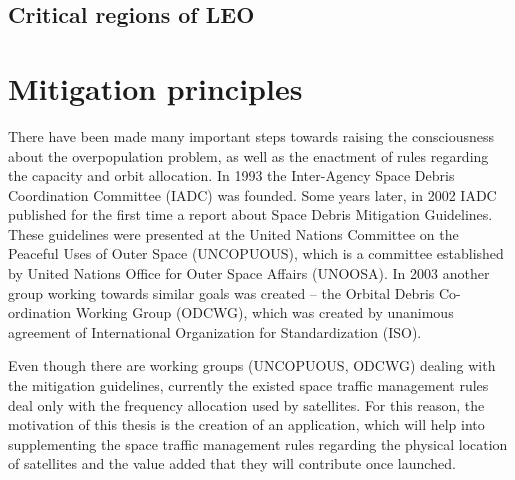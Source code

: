 

\subsection{Critical regions of LEO}
\bigskip

\section{Mitigation principles}
\bigskip

There have been made many important steps towards raising the consciousness about the overpopulation problem, as well as the enactment of rules regarding the capacity and orbit allocation. In 1993 the Inter-Agency Space Debris Coordination Committee (IADC) was founded. Some years later, in 2002 IADC published for the first time a report about Space Debris Mitigation Guidelines. These guidelines were presented at the United Nations Committee on the Peaceful Uses of Outer Space (UNCOPUOUS), which is a committee established by United Nations Office for Outer Space Affairs (UNOOSA). In 2003 another group working towards similar goals was created – the Orbital Debris Co-ordination Working Group (ODCWG), which was created by unanimous agreement of International Organization for Standardization (ISO). \cite{Klinkrad 2006}

Even though there are working groups (UNCOPUOUS, ODCWG) dealing with the mitigation guidelines, currently the existed space traffic management rules deal only with the frequency allocation used by satellites. For this reason, the motivation of this thesis is the creation of an application, which will help into supplementing the space traffic management rules regarding the physical location of satellites and the value added that they will contribute once launched.



